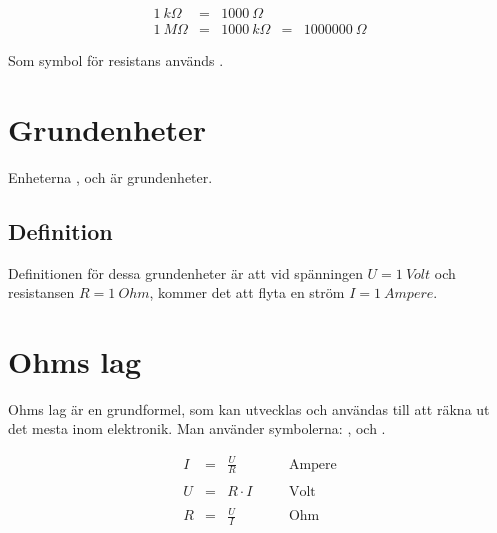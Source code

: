 \[
\begin{array}{rclcl}
\SI{1}{k\Omega} &=& \SI{1000}{\Omega} \\
\SI{1}{M\Omega} &=& \SI{1000}{k\Omega} &=& \SI{1000000}{\Omega}
\end{array}
\]

Som symbol för resistans används .

\section{Grundenheter}

Enheterna ,  och \enhet{\Omega} är grundenheter.

\subsection{Definition}

Definitionen för dessa grundenheter är att
vid spänningen $U = \SI{1}{Volt}$ och resistansen
$R = \SI{1}{Ohm}$, kommer det att flyta en ström
$I = \SI{1}{Ampere}$.


\section{Ohms lag}

Ohms lag är en grundformel, som kan
utvecklas och användas till att räkna ut det
mesta inom elektronik. Man använder symbolerna: ,  och .

\[
\begin{array}{rclcl}
  I &=& \frac{U}{R} &\quad& \text{Ampere} \\
  \\
  U &=& R \cdot I &\quad& \text{Volt} \\
  \\
  R &=& \frac{U}{I} &\quad& \text{Ohm}
\end{array}
\]

